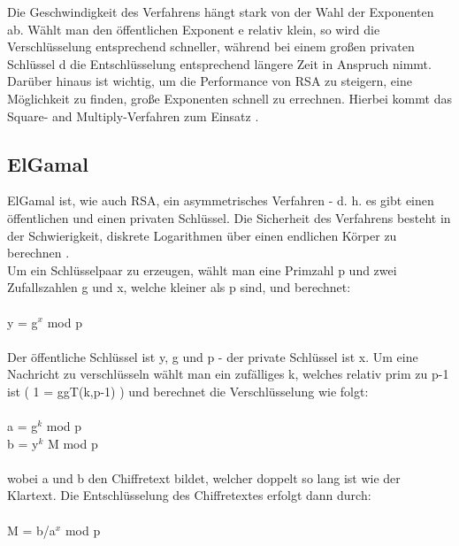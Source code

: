 \documentclass[10pt, a4paper,headsepline,pointednumbers]{scrreprt}
\begin{document}
Die Geschwindigkeit des Verfahrens hängt stark von der Wahl der Exponenten ab. Wählt man den öffentlichen Exponent e relativ klein, so wird die Verschlüsselung entsprechend schneller, während bei einem großen privaten Schlüssel d die Entschlüsselung entsprechend längere Zeit in Anspruch nimmt. Darüber hinaus ist wichtig, um die Performance von RSA zu steigern, eine Möglichkeit zu finden, große Exponenten schnell zu errechnen. Hierbei kommt das Square- and Multiply-Verfahren zum Einsatz \citep[S. 173ff]{book:understanding-crypto}.

\subsection{ElGamal}
ElGamal ist, wie auch RSA, ein asymmetrisches Verfahren - d. h. es gibt einen öffentlichen und einen privaten Schlüssel. Die Sicherheit des Verfahrens besteht in der Schwierigkeit, diskrete Logarithmen über einen endlichen Körper zu berechnen \citep[S. 543ff]{book:angewandte-krypto}. \\
Um ein Schlüsselpaar zu erzeugen, wählt man eine Primzahl p und zwei Zufallszahlen g und x, welche kleiner als p sind, und berechnet: \\ \\
y = g$^{x}$ mod p \\ \\
Der öffentliche Schlüssel ist y, g und p - der private Schlüssel ist x. Um eine Nachricht zu verschlüsseln wählt man ein zufälliges k, welches relativ prim zu p-1 ist ( 1 = ggT(k,p-1) ) und berechnet die Verschlüsselung wie folgt: \\ \\
a = g$^{k}$ mod p \\
b = y$^{k}$ M mod p \\ \\
wobei a und b den Chiffretext bildet, welcher doppelt so lang ist wie der Klartext. Die Entschlüsselung des Chiffretextes erfolgt dann durch: \\ \\
M = b/a$^{x}$ mod p \\
\end{document}
